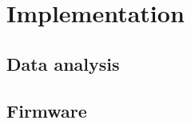 \chapter{Implementation} \label{section:implementation} 

\section{Data analysis}


\section{Firmware}


